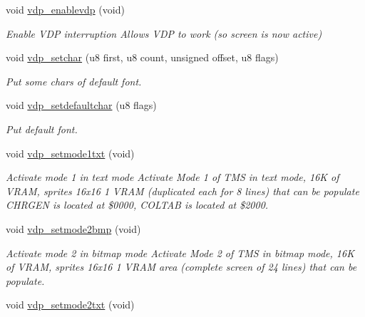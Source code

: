 \begin{DoxyCompactItemize}
\mbox{\label{a00056_a79f55e5785e18e189852d14a78f7da64}} 
void \hyperlink{a00056_a79f55e5785e18e189852d14a78f7da64}{vdp\+\_\+enablevdp} (void)
\begin{DoxyCompactList}\small\item\em Enable V\+DP interruption Allows V\+DP to work (so screen is now active) \end{DoxyCompactList}\item 
void \hyperlink{a00056_ac70a5cddd82471f4d7ca9b84d8a58760}{vdp\+\_\+setchar} (u8 first, u8 count, unsigned offset, u8 flags)
\begin{DoxyCompactList}\small\item\em Put some chars of default font. \end{DoxyCompactList}\item 
void \hyperlink{a00056_a56edf716a6be2b5850249d24861fc845}{vdp\+\_\+setdefaultchar} (u8 flags)
\begin{DoxyCompactList}\small\item\em Put default font. \end{DoxyCompactList}\item 
\mbox{\label{a00056_a29716781cc1ede1b6958c0a329c245ea}} 
void \hyperlink{a00056_a29716781cc1ede1b6958c0a329c245ea}{vdp\+\_\+setmode1txt} (void)
\begin{DoxyCompactList}\small\item\em Activate mode 1 in text mode Activate Mode 1 of T\+MS in text mode, 16K of V\+R\+AM, sprites 16x16 1 V\+R\+AM (duplicated each for 8 lines) that can be populate C\+H\+R\+G\+EN is located at \$0000, C\+O\+L\+T\+AB is located at \$2000. \end{DoxyCompactList}\item 
\mbox{\label{a00056_a508aaacd078ecdecf5883795c04bc40c}} 
void \hyperlink{a00056_a508aaacd078ecdecf5883795c04bc40c}{vdp\+\_\+setmode2bmp} (void)
\begin{DoxyCompactList}\small\item\em Activate mode 2 in bitmap mode Activate Mode 2 of T\+MS in bitmap mode, 16K of V\+R\+AM, sprites 16x16 1 V\+R\+AM area (complete screen of 24 lines) that can be populate. \end{DoxyCompactList}\item 
\mbox{\label{a00056_a82f80697be61ae9fc4651379b907190a}} 
void \hyperlink{a00056_a82f80697be61ae9fc4651379b907190a}{vdp\+\_\+setmode2txt} (void)

\end{DoxyCompactItemize}
